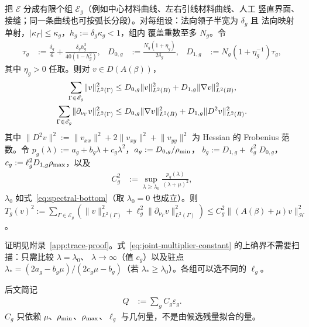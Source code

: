 \begin{proposition}[分组迹估计]
  \label{prop:grouped-trace-bound}
  把 $\mathscr E$ 分成有限个组 $\mathscr E_g$（例如中心材料曲线、左右引线材料曲线、人工
  竖直界面、接缝；同一条曲线也可按弧长分段）。对每组设：法向领子半宽为 $\delta_g$ 且
  法向映射单射，$\lvert\kappa_\Gamma\rvert\leq\kappa_g$，$h_g:=\delta_g\kappa_g<1$，组内
  覆盖重数至多 $N_g$。令
  \begin{align}
    \tau_g&:=\frac{\delta_g}{6}+\frac{\delta_gh_g^2}{40(1-h_g^2)},
    &D_{0,g}&:=\frac{N_g(1+\eta_g)}{2\delta_g},
    &D_{1,g}&:=N_g(1+\eta_g^{-1})\tau_g,
    \label{eq:jacobian-trace-constants}
  \end{align}
  其中 $\eta_g>0$ 任取。则对 $v\in D(A(\beta))$，
  \begin{align}
    \sum_{\Gamma\in\mathscr E_g}\lVert v\rVert_{L^2(\Gamma)}^2
    &\leq D_{0,g}\lVert v\rVert_{L^2(B)}^2+D_{1,g}\lVert\nabla v\rVert_{L^2(B)}^2,
    \notag\\
    \sum_{\Gamma\in\mathscr E_g}\lVert\partial_{\nu_\Gamma}v\rVert_{L^2(\Gamma)}^2
    &\leq D_{0,g}\lVert\nabla v\rVert_{L^2(B)}^2+D_{1,g}\lVert D^2v\rVert_{L^2(B)}^2 .
    \label{eq:jacobian-trace-bound}
  \end{align}
  其中 $\lVert D^2v\rVert^2:=\lVert v_{xx}\rVert^2+2\lVert v_{xy}\rVert^2+\lVert v_{yy}\rVert^2$
  为 Hessian 的 Frobenius 范数。令 $p_g(\lambda):=a_g+b_g\lambda+c_g\lambda^2$，$a_g:=D_{0,g}/\rho_{\min}$，
  $b_g:=D_{1,g}+\ell_g^2D_{0,g}$，$c_g:=\ell_g^2D_{1,g}\rho_{\max}$，以及
  \begin{align}
    C_g^2&:=\sup_{\lambda\geq\lambda_0}\frac{p_g(\lambda)}{(\lambda+\mu)^2},
    \label{eq:joint-multiplier-constant}
  \end{align}
  $\lambda_0$ 如式~\eqref{eq:spectral-bottom}（取 $\lambda_0=0$ 也成立）。则
  $T_g(v)^2:=\sum_{\Gamma\in\mathscr E_g}(\lVert v\rVert_{L^2(\Gamma)}^2
  +\ell_g^2\lVert\partial_{\nu_\Gamma}v\rVert_{L^2(\Gamma)}^2)
  \leq C_g^2\lVert(A(\beta)+\mu)v\rVert_{\mathcal H}^2$。
\end{proposition}

证明见附录~\ref{app:trace-proof}。式~\eqref{eq:joint-multiplier-constant} 的上确界不需要扫描：只需比较 $\lambda=\lambda_0$、
$\lambda\to\infty$（值 $c_g$）以及驻点 $\lambda_*=(2a_g-b_g\mu)/(2c_g\mu-b_g)$（若
$\lambda_*\geq\lambda_0$）。各组可以选不同的 $\ell_g$。

后文简记
\begin{align}
  Q&:=\sum_gC_g\varepsilon_g .
  \label{eq:trace-defect-product}
\end{align}
$C_g$ 只依赖 $\mu$、$\rho_{\min}$、$\rho_{\max}$、$\ell_g$ 与几何量，不是由候选残量拟合的量。


